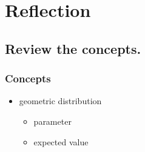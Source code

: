 \documentclass{beamer} %
\begin{document}
\setcounter{equation}{0} %

\section{Reflection}

\subsection*{Review the concepts.}

\begin{frame}
  \frametitle{Concepts}
  \begin{itemize}
    \item geometric distribution
    \begin{itemize}
      \item parameter
      \item expected value
    \end{itemize}
  \end{itemize}
\end{frame}
\end{document}
